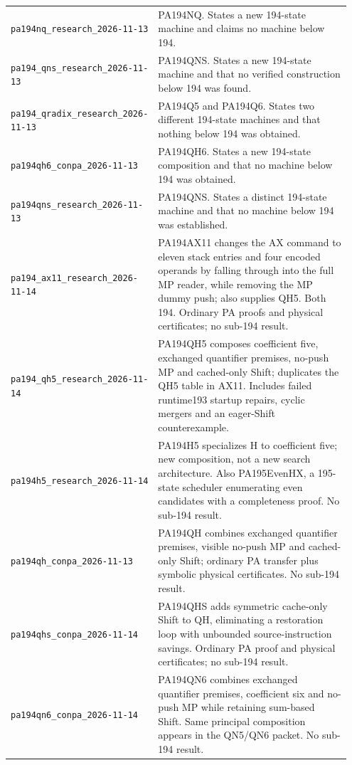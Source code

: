 \begin{longtable}{@{}p{0.36\linewidth}p{0.59\linewidth}@{}}
\nolinkurl{pa194nq_research_2026-11-13} & PA194NQ. States a new 194-state machine and claims no machine below 194.\\[4pt]
\nolinkurl{pa194_qns_research_2026-11-13} & PA194QNS. States a new 194-state machine and that no verified construction below 194 was found.\\[4pt]
\nolinkurl{pa194_qradix_research_2026-11-13} & PA194Q5 and PA194Q6. States two different 194-state machines and that nothing below 194 was obtained.\\[4pt]
\nolinkurl{pa194qh6_conpa_2026-11-13} & PA194QH6. States a new 194-state composition and that no machine below 194 was obtained.\\[4pt]
\nolinkurl{pa194qns_research_2026-11-13} & PA194QNS. States a distinct 194-state machine and that no machine below 194 was established.\\[4pt]
\nolinkurl{pa194_ax11_research_2026-11-14} & PA194AX11 changes the AX command to eleven stack entries and four encoded operands by falling through into the full MP reader, while removing the MP dummy push; also supplies QH5. Both 194. Ordinary PA proofs and physical certificates; no sub-194 result.\\[4pt]
\nolinkurl{pa194_qh5_research_2026-11-14} & PA194QH5 composes coefficient five, exchanged quantifier premises, no-push MP and cached-only Shift; duplicates the QH5 table in AX11. Includes failed runtime193 startup repairs, cyclic mergers and an eager-Shift counterexample.\\[4pt]
\nolinkurl{pa194h5_research_2026-11-14} & PA194H5 specializes H to coefficient five; new composition, not a new search architecture. Also PA195EvenHX, a 195-state scheduler enumerating even candidates with a completeness proof. No sub-194 result.\\[4pt]
\nolinkurl{pa194qh_conpa_2026-11-13} & PA194QH combines exchanged quantifier premises, visible no-push MP and cached-only Shift; ordinary PA transfer plus symbolic physical certificates. No sub-194 result.\\[4pt]
\nolinkurl{pa194qhs_conpa_2026-11-14} & PA194QHS adds symmetric cache-only Shift to QH, eliminating a restoration loop with unbounded source-instruction savings. Ordinary PA proof and physical certificates; no sub-194 result.\\[4pt]
\nolinkurl{pa194qn6_conpa_2026-11-14} & PA194QN6 combines exchanged quantifier premises, coefficient six and no-push MP while retaining sum-based Shift. Same principal composition appears in the QN5/QN6 packet. No sub-194 result.\\[4pt]

\end{longtable}

